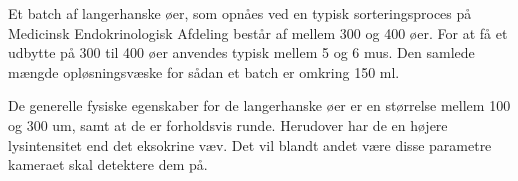 Et batch af langerhanske øer, som opnåes ved en typisk sorteringsproces på Medicinsk Endokrinologisk Afdeling består af mellem 300 og 400 øer. For at få et udbytte på 300 til 400 øer anvendes typisk mellem 5 og 6 mus. Den samlede mængde opløsningsvæske for sådan et batch er omkring 150 ml.

De generelle fysiske egenskaber for de langerhanske øer er en størrelse mellem 100 og 300 um, samt at de er forholdsvis runde. Herudover har de en højere lysintensitet end det eksokrine væv. Det vil blandt andet være disse parametre kameraet skal detektere dem på.





